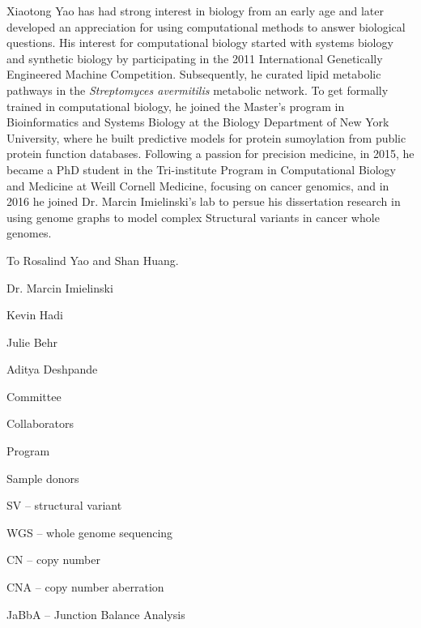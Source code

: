 \documentclass[phd,tocprelim]{cornell}
\begin{document}
\begin{biosketch}
    Xiaotong Yao has had strong interest in biology from an early age and later developed an appreciation for using computational methods to answer biological questions. His interest for computational biology started with systems biology and synthetic biology by participating in the 2011 International Genetically Engineered Machine Competition. Subsequently, he curated lipid metabolic pathways in the \textit{Streptomyces avermitilis} metabolic network. To get formally trained in computational biology, he joined the Master's program in Bioinformatics and Systems Biology at the Biology Department of New York University, where he built predictive models for protein sumoylation from public protein function databases. Following a passion for precision medicine, in 2015, he became a PhD student in the Tri-institute Program in Computational Biology and Medicine at Weill Cornell Medicine, focusing on cancer genomics, and in 2016 he joined Dr. Marcin Imielinski's lab to persue his dissertation research in using genome graphs to model complex Structural variants in cancer whole genomes.
\end{biosketch}

\begin{dedication}
    To Rosalind Yao and Shan Huang.
\end{dedication}

\begin{acknowledgements}
    Dr. Marcin Imielinski

    Kevin Hadi

    Julie Behr
    
    Aditya Deshpande

    Committee

    Collaborators

    Program

    Sample donors

\end{acknowledgements}

\contentspage
\tablelistpage
\figurelistpage
\abbrlist

SV -- structural variant

WGS -- whole genome sequencing

CN -- copy number

CNA -- copy number aberration

JaBbA -- Junction Balance Analysis

\symlist

\normalspacing \setcounter{page}{1} 
\pagestyle{cornell} \addtolength{\parskip}{0.5\baselineskip}
\end{document}
